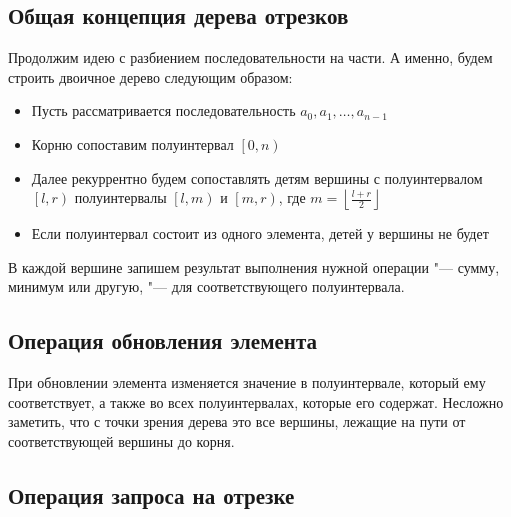 \documentclass[a4paper,12pt]{article}
\begin{document}
    \subsection{Общая концепция дерева отрезков}

    Продолжим идею с разбиением последовательности
    на части. А именно, будем строить двоичное дерево
    следующим образом:
    \begin{itemize}
      \item Пусть рассматривается последовательность
        $a_0, a_1, \ldots, a_{n-1}$
      \item Корню сопоставим полуинтервал
        $\left[0, n\right)$
      \item Далее рекуррентно будем сопоставлять детям
        вершины с полуинтервалом $\left[l, r\right)$
        полуинтервалы $\left[l, m\right)$ и
        $\left[m, r\right)$, где
        $m = \left \lfloor \frac{l + r}{2} \right \rfloor$
      \item Если полуинтервал состоит из одного элемента,
        детей у вершины не будет
    \end{itemize}

    В каждой вершине запишем результат выполнения
    нужной операции "--- сумму, минимум или другую, "---
    для соответствующего полуинтервала.

    \subsection{Операция обновления элемента}

    При обновлении элемента изменяется значение
    в полуинтервале, который ему соответствует, а также
    во всех полуинтервалах, которые его содержат. Несложно
    заметить, что с точки зрения дерева это все вершины,
    лежащие на пути от соответствующей вершины до корня.

    \subsection{Операция запроса на отрезке}
\end{document}
